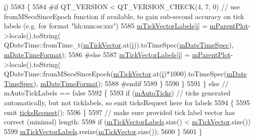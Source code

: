 \begin{DoxyCode}
      \hyperlink{_comparision_pictures_2_createtest_image_8m_a6f6ccfcf58b31cb6412107d9d5281426}{i})
5583       \{
5584 \textcolor{preprocessor}{#if QT\_VERSION < QT\_VERSION\_CHECK(4, 7, 0) // use fromMSecsSinceEpoch function if available, to gain
       sub-second accuracy on tick labels (e.g. for format "hh:mm:ss:zzz")}
5585         \hyperlink{class_q_c_p_axis_aeee4bd0fca3f587eafe33843d1cb4f82}{mTickVectorLabels}[\hyperlink{_comparision_pictures_2_createtest_image_8m_a6f6ccfcf58b31cb6412107d9d5281426}{i}] = \hyperlink{class_q_c_p_layerable_aa2a528433e44db02b8aef23c1f9f90ed}{mParentPlot}->locale().toString(
      QDateTime::fromTime\_t(\hyperlink{class_q_c_p_axis_aae0f9b9973b85be601200f00f5825087}{mTickVector}.at(\hyperlink{_comparision_pictures_2_createtest_image_8m_a6f6ccfcf58b31cb6412107d9d5281426}{i})).toTimeSpec(\hyperlink{class_q_c_p_axis_af73bec228c1a3203dc8aef1e84a46759}{mDateTimeSpec}), 
      \hyperlink{class_q_c_p_axis_a0b7ad83550d71daab4cfee2918e168e0}{mDateTimeFormat});
5586 \textcolor{preprocessor}{#else}
5587         \hyperlink{class_q_c_p_axis_aeee4bd0fca3f587eafe33843d1cb4f82}{mTickVectorLabels}[\hyperlink{_comparision_pictures_2_createtest_image_8m_a6f6ccfcf58b31cb6412107d9d5281426}{i}] = \hyperlink{class_q_c_p_layerable_aa2a528433e44db02b8aef23c1f9f90ed}{mParentPlot}->locale().toString(
      QDateTime::fromMSecsSinceEpoch(\hyperlink{class_q_c_p_axis_aae0f9b9973b85be601200f00f5825087}{mTickVector}.at(\hyperlink{_comparision_pictures_2_createtest_image_8m_a6f6ccfcf58b31cb6412107d9d5281426}{i})*1000).toTimeSpec(\hyperlink{class_q_c_p_axis_af73bec228c1a3203dc8aef1e84a46759}{mDateTimeSpec}), 
      \hyperlink{class_q_c_p_axis_a0b7ad83550d71daab4cfee2918e168e0}{mDateTimeFormat});
5588 \textcolor{preprocessor}{#endif}
5589       \}
5590     \}
5591   \} \textcolor{keywordflow}{else} \textcolor{comment}{// mAutoTickLabels == false}
5592   \{
5593     \textcolor{keywordflow}{if} (\hyperlink{class_q_c_p_axis_aac23adcbae246bf165d4539ad65ac9f9}{mAutoTicks}) \textcolor{comment}{// ticks generated automatically, but not ticklabels, so emit ticksRequest
       here for labels}
5594     \{
5595       emit \hyperlink{class_q_c_p_axis_af46d99613d29518795134ec4928e3873}{ticksRequest}();
5596     \}
5597     \textcolor{comment}{// make sure provided tick label vector has correct (minimal) length:}
5598     \textcolor{keywordflow}{if} (\hyperlink{class_q_c_p_axis_aeee4bd0fca3f587eafe33843d1cb4f82}{mTickVectorLabels}.size() < \hyperlink{class_q_c_p_axis_aae0f9b9973b85be601200f00f5825087}{mTickVector}.size())
5599       \hyperlink{class_q_c_p_axis_aeee4bd0fca3f587eafe33843d1cb4f82}{mTickVectorLabels}.resize(\hyperlink{class_q_c_p_axis_aae0f9b9973b85be601200f00f5825087}{mTickVector}.size());
5600   \}
5601 \}
\end{DoxyCode}


